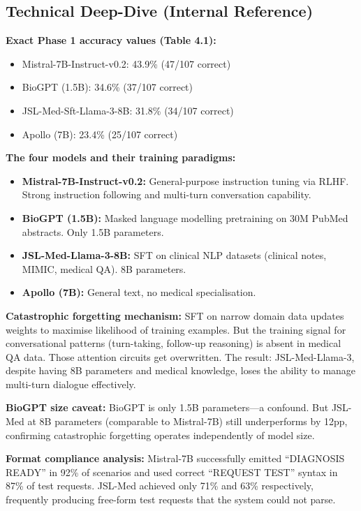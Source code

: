 \documentclass[12pt]{article}
\begin{document}
  \subsection*{Technical Deep-Dive (Internal Reference)}
  {\color{techgray}
  \textbf{Exact Phase 1 accuracy values (Table 4.1):}
  \begin{itemize}
    \item Mistral-7B-Instruct-v0.2: 43.9\% (47/107 correct)
    \item BioGPT (1.5B): 34.6\% (37/107 correct)
    \item JSL-Med-Sft-Llama-3-8B: 31.8\% (34/107 correct)
    \item Apollo (7B): 23.4\% (25/107 correct)
  \end{itemize}

  \textbf{The four models and their training paradigms:}
  \begin{itemize}
    \item \textbf{Mistral-7B-Instruct-v0.2:} General-purpose instruction tuning via RLHF. Strong instruction following and multi-turn conversation capability.
    \item \textbf{BioGPT (1.5B):} Masked language modelling pretraining on 30M PubMed abstracts. Only 1.5B parameters.
    \item \textbf{JSL-Med-Llama-3-8B:} SFT on clinical NLP datasets (clinical notes, MIMIC, medical QA). 8B parameters.
    \item \textbf{Apollo (7B):} General text, no medical specialisation.
  \end{itemize}

  \textbf{Catastrophic forgetting mechanism:} SFT on narrow domain data updates weights to maximise likelihood of training examples. But the training signal for conversational patterns (turn-taking, follow-up reasoning) is absent in medical QA data. Those attention circuits get overwritten. The result: JSL-Med-Llama-3, despite having 8B parameters and medical knowledge, loses the ability to manage multi-turn dialogue effectively.

  \textbf{BioGPT size caveat:} BioGPT is only 1.5B parameters---a confound. But JSL-Med at 8B parameters (comparable to Mistral-7B) still underperforms by 12pp, confirming catastrophic forgetting operates independently of model size.

  \textbf{Format compliance analysis:} Mistral-7B successfully emitted ``DIAGNOSIS READY'' in 92\% of scenarios and used correct ``REQUEST TEST'' syntax in 87\% of test requests. JSL-Med achieved only 71\% and 63\% respectively, frequently producing free-form test requests that the system could not parse.
  }
\end{document}
